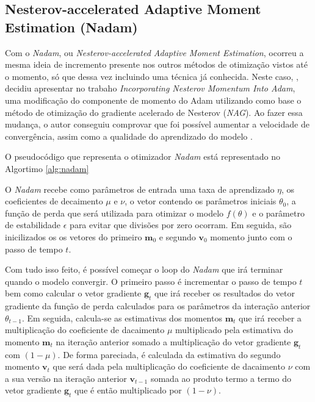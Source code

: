 \subsection{Nesterov-accelerated Adaptive Moment Estimation (Nadam)}

Com o \textit{Nadam}, ou \textit{Nesterov-accelerated Adaptive Moment Estimation}, ocorreu a mesma ideia de incremento presente nos outros métodos de otimização vistos até o momento, só que dessa vez incluindo uma técnica já conhecida. Neste caso, \textcite{NadamMethod}, decidiu apresentar no trabaho \textit{Incorporating Nesterov Momentum Into Adam}, uma modificação do componente de momento do Adam utilizando como base o método de otimização do gradiente acelerado de Nesterov (\textit{NAG}). Ao fazer essa mudança, o autor conseguiu comprovar que foi possível aumentar a velocidade de convergência, assim como a qualidade do aprendizado do modelo \parencite{NadamMethod}.

O pseudocódigo que representa o otimizador \textit{Nadam} está representado no Algortimo \ref{alg:nadam}

O \textit{Nadam} recebe como parâmetros de entrada uma taxa de aprendizado $\eta$, os coeficientes de decaimento $\mu$ e $\nu$, o vetor contendo os parâmetros iniciais $\theta_0$, a função de perda que será utilizada para otimizar o modelo $f(\theta)$ e o parâmetro de estabilidade $\epsilon$ para evitar que divisões por zero ocorram. Em seguida, são inicilizados os os vetores do primeiro $\mathbf{m}_0$ e segundo $\mathbf{v}_0$ momento junto com o passo de tempo $t$.

Com tudo isso feito, é possível começar o loop do \textit{Nadam} que irá terminar quando o modelo convergir. O primeiro passo é incrementar o passo de tempo $t$ bem como calcular o vetor gradiente $\mathbf{g}_t$ que irá receber os resultados do vetor gradiente da função de perda calculados para os parâmetros da interação anterior $\theta_{t-1}$. Em seguida, calcula-se as estimativas dos momentos $\mathbf{m}_t$ que irá receber a multiplicação do coeficiente de dacaimento $\mu$ multiplicado pela estimativa do momento $\mathbf{m}_t$ na iteração anterior somado a multiplicação do vetor gradiente $\mathbf{g}_t$ com $(1 - \mu)$. De forma pareciada, é calculada da estimativa do segundo momento $\mathbf{v}_t$ que será dada pela multiplicação do coeficiente de dacaimento $\nu$ com a sua versão na iteração anterior $\mathbf{v}_{t-1}$ somada ao produto termo a termo do vetor gradiente $\mathbf{g}_t$ que é então multiplicado por $(1 - \nu)$.

